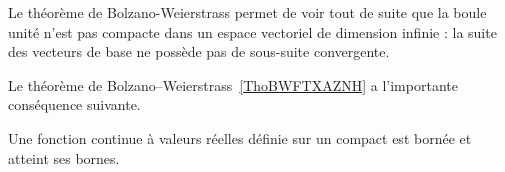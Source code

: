 \begin{example}\label{ExEFYooTILPDk}
	Le théorème de Bolzano-Weierstrass permet de voir tout de suite que la boule unité n'est pas compacte dans un espace vectoriel de dimension infinie : la suite des vecteurs de base ne possède pas de sous-suite convergente.
\end{example}


Le théorème de Bolzano–Weierstrass~\ref{ThoBWFTXAZNH} a l'importante conséquence suivante.
\begin{theorem}[Weierstrass]		\label{ThoWeirstrassRn}
	Une fonction continue à valeurs réelles définie sur un compact est bornée et atteint ses bornes.
\end{theorem}

